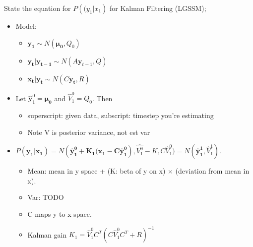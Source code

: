 \documentclass{article}
\begin{document}
State the equation for $P(\mathbf(y_1|x_1)$ for Kalman Filtering (LGSSM); \begin{itemize} \item Model: \begin{itemize} \item $\mathbf{y_1}\sim N(\mathbf{\mu_0},Q_0)$ \item $\mathbf{y_t|y_{t-1}}\sim N(A\mathbf{y}_{t-1}, Q)$ \item $\mathbf{x_t|y_t}\sim N(C\mathbf{y_t},R)$ \end{itemize} \item Let $\hat{\mathbf{y}}^0_1=\mathbf{\mu_0}$ and $\hat{V}^0_1=Q_0$. Then \begin{itemize} \item superscript: given data, subscript: timestep you're estimating \item Note V is posterior variance, not est var \end{itemize} \item $P(\mathbf{y_1|x_1})=N(\mathbf{\hat{y}_1^0+K_1(\mathbf{x_1}-C\hat{\mathbf{y}}^0_1}), \hat{V^0_1}-K_1C\hat{V}^0_1)=N(\mathbf{\hat{y}^1_1}, \hat{V}^1_1)$. \begin{itemize} \item Mean: mean in y space + (K: beta of y on x) $\times$ (deviation from mean in x). \item Var: TODO \item C maps y to x space. \item Kalman gain $K_1=\hat{V}^0_1C^T(C\hat{V}^0_1C^T+R)^{-1}$ \end{itemize} \end{itemize}
    
\end{document}
